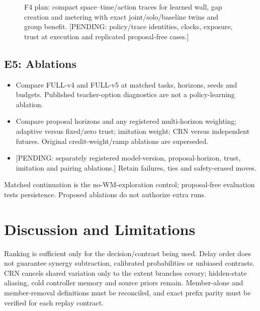 \documentclass[conference]{IEEEtran}
\newcommand{\pending}[1]{\textcolor{red!80!black}{[PENDING: #1]}}
\newcommand{\blankpanel}[1]{\fbox{\rule{0pt}{#1}\rule{0.94\columnwidth}{0pt}}}
\begin{document}
\begin{figure}[t]
\centering\blankpanel{1.25in}
\caption{F4 plan: compact space--time/action traces for learned wall, gap
creation and metering with exact joint/solo/baseline twins and group benefit.
\pending{policy/trace identities, clocks, exposure, trust at execution and
replicated proposal-free cases.}}
\label{fig:behaviour}
\end{figure}

\subsection{E5: Ablations}
\begin{itemize}
\item Compare FULL-v4 and FULL-v5 at matched tasks, horizons, seeds and budgets.
Published teacher-option diagnostics are not a policy-learning ablation.
\item Compare proposal horizons and any registered multi-horizon weighting;
adaptive versus fixed/zero trust; imitation weight; CRN versus independent
futures. Original credit-weight/ramp ablations are superseded.
\item \pending{separately registered model-version, proposal-horizon, trust,
imitation and pairing ablations.} Retain failures, ties and safety-erased moves.
\end{itemize}
Matched continuation is the no-WM-exploration control; proposal-free evaluation
tests persistence. Proposed ablations do not authorize extra runs.

\begin{table}[t]
\caption{T2 plan: proposal model/horizon, trust, imitation and pairing
ablations; matched budget, fidelity/noise, delay gain, exact cooperation,
persistence and safety. \pending{ablation exports; no imputed cells.}}
\centering\blankpanel{0.90in}
\label{tab:ablations}
\end{table}

\section{Discussion and Limitations}
Ranking is sufficient only for the decision/contrast being used. Delay order
does not guarantee synergy subtraction, calibrated probabilities or unbiased
contrasts. CRN cancels shared variation only to the extent branches covary;
hidden-state aliasing, cold controller memory and source priors remain.
Member-alone and member-removal definitions must be reconciled, and exact
prefix parity must be verified for each replay contract.
\end{document}

